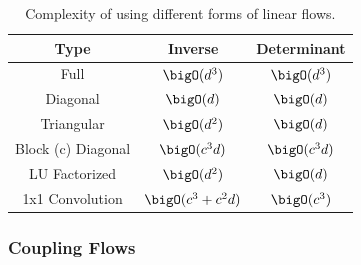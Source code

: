 \begin{table}[h!]
    \centering
    \caption{Complexity of using different forms of linear flows.}
    \label{tab:linear_flows}
    \begin{tabular}{ccc}
        \toprule
        \textbf{Type}      & \textbf{Inverse}    & \textbf{Determinant} \\
        \midrule
        Full               & $\bigO(d^3)$        & $\bigO(d^3)$         \\
        Diagonal           & $\bigO(d)$          & $\bigO(d)$           \\
        Triangular         & $\bigO(d^2)$        & $\bigO(d)$           \\
        Block (c) Diagonal & $\bigO(c^3d)$       & $\bigO(c^3d)$        \\
        LU Factorized      & $\bigO(d^2)$        & $\bigO(d)$           \\
        1x1 Convolution    & $\bigO(c^3 + c^2d)$ & $\bigO(c^3)$         \\
        \bottomrule
    \end{tabular}
\end{table}

\subsubsection{Coupling Flows}

